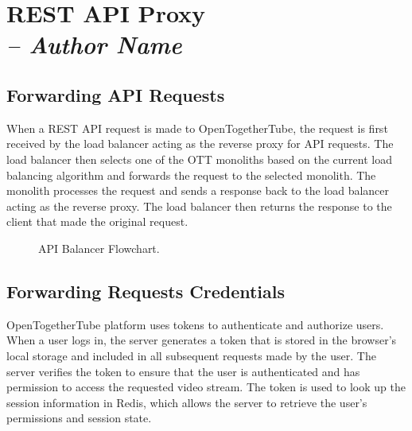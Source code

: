 \chapter{REST API Proxy \\
  \small{\textit{-- Author Name}}
  \label{Chapter::RestApiProxy}}

\section{Forwarding API Requests}
When a REST API request is made to OpenTogetherTube, the request is first received by the load balancer
 acting as the reverse proxy for API requests. The load balancer then selects one of the OTT monoliths based
  on the current load balancing algorithm and forwards the request to the selected monolith. The monolith processes 
  the request and sends a response back to the load balancer acting as the reverse proxy. The load balancer then returns 
  the response to the client that made the original request.

\begin{figure}[!htb]
  \centering
  \caption{\label{Figure::api-balancer} API Balancer Flowchart.}
\end{figure}

\section{Forwarding Requests Credentials}

OpenTogetherTube platform uses tokens to authenticate and authorize users. When a user logs in, the
server generates a token that is stored in the browser's local storage and included in all subsequent requests made
by the user. The server verifies the token to ensure that the user is authenticated and has permission to access the
requested video stream. The token is used to look up the session information in Redis, which allows the server to 
retrieve the user's permissions and session state.